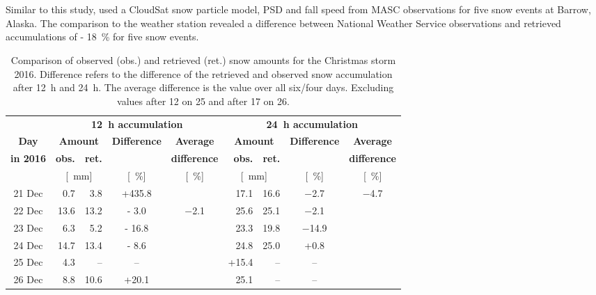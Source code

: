 \\
\\
Similar to this study, \citet{cooper_variational_2017} used a CloudSat snow particle model, PSD and fall speed from MASC observations for five snow events at Barrow, Alaska. The comparison to the weather station revealed a difference between National Weather Service observations and retrieved accumulations of \SI{- 18}{\percent} for five snow events.
\begin{table}[t!]
	\begin{center}
		\caption{Comparison of observed (obs.) and retrieved (ret.) snow amounts for the Christmas storm 2016. Difference refers to the difference of the retrieved and observed snow accumulation after \SI{12}{\hour} and \SI{24}{\hour}. The average difference is the value over all six/four days. Excluding values after \SI{12}{\UTC} on \SI{25}{\dec} and after \SI{17}{\UTC} on \SI{26}{\dec}.}\label{tab:res:ret_error}
		\begin{tabular}{c||r|r|c|c||r|r|c|c}
			\hline \hline
			& \multicolumn{4}{c||}{\textbf{\SI{12}{\hour} accumulation}} & \multicolumn{4}{c}{\textbf{\SI{24}{\hour} accumulation}}    \\ \cline{2-9}
			\textbf{Day} & \multicolumn{2}{c|}{\textbf{Amount}} & \textbf{Difference} & \textbf{Average} &  \multicolumn{2}{c|}{\textbf{Amount}} & \textbf{Difference} & \textbf{Average}  \\\cline{2-3} \cline{6-7}
			\textbf{in 2016} & \textbf{obs.} & \textbf{ret.} & & \textbf{difference} & \textbf{obs.} & \textbf{ret.} & & \textbf{difference} \\\cline{2-9}
			& \multicolumn{2}{c|}{[\SI{}{\mm}]} & [\SI{}{\percent}] & [\SI{}{\percent}] & \multicolumn{2}{c|}{[\SI{}{\mm}]} & [\SI{}{\percent}] & [\SI{}{\percent}] \\ \hline\hline
			\num{21} Dec & \num{0.7} & \num{3.8} & +\num{435.8} &  & \num{17.1} & \num{16.6} & \num{-2.7} & \multirow{4}{*}{\num{-4.7}}   \\\cline{1-5}\cline{6-8}
			\num{22} Dec & \num{13.6}& \num{13.2} & \num{- 3.0} & \multirow{5}{*}{\num{-2.1}} & \num{25.6} &\num{25.1} & \num{-2.1} &   \\\cline{1-4}\cline{6-8}
			\num{23} Dec & \num{6.3} &\num{5.2} & \num{- 16.8} & & \num{23.3}& \num{19.8} & \num{-14.9} &   \\\cline{1-4}\cline{6-8}
			\num{24} Dec & \num{14.7} & \num{13.4} & \num{- 8.6} && \num{24.8} & \num{25.0} & +\num{0.8} &   \\\cline{1-4}\cline{6-9}
			\num{25} Dec &  \num{4.3} & -- & -- & & +\num{15.4} & -- & -- & \\\cline{1-4}\cline{6-9}
			\num{26} Dec & \num{8.8} & \num{10.6} & +\num{20.1} &  &  \num{25.1} &-- & -- &  \\\hline\hline
		\end{tabular}
	\end{center}
\end{table}
